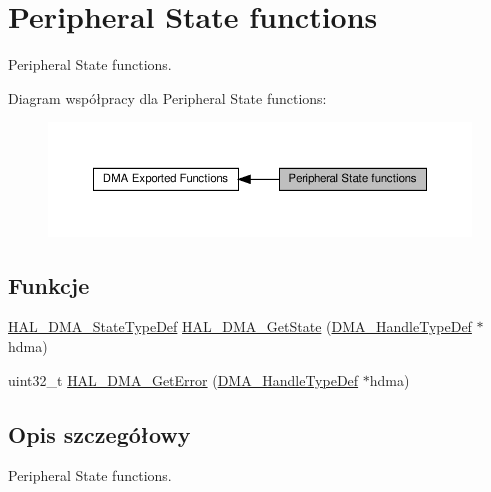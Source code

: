 \hypertarget{group___d_m_a___exported___functions___group3}{}\section{Peripheral State functions}
\label{group___d_m_a___exported___functions___group3}


Peripheral State functions.  


Diagram współpracy dla Peripheral State functions\+:\nopagebreak
\begin{figure}[H]
\begin{center}
\leavevmode
\includegraphics[width=350pt]{group___d_m_a___exported___functions___group3}
\end{center}
\end{figure}
\subsection*{Funkcje}
\begin{DoxyCompactItemize}
\item 
\hyperlink{group___d_m_a___exported___types_ga9c012af359987a240826f29073bbe463}{H\+A\+L\+\_\+\+D\+M\+A\+\_\+\+State\+Type\+Def} \hyperlink{group___d_m_a___exported___functions___group3_gaef09509c41da57dc118c8ffb9533ce3f}{H\+A\+L\+\_\+\+D\+M\+A\+\_\+\+Get\+State} (\hyperlink{group___d_m_a___exported___types_ga41b754a906b86bce54dc79938970138b}{D\+M\+A\+\_\+\+Handle\+Type\+Def} $\ast$hdma)
\item 
uint32\+\_\+t \hyperlink{group___d_m_a___exported___functions___group3_gabc0735694a0dd08e352b796d7fa7634f}{H\+A\+L\+\_\+\+D\+M\+A\+\_\+\+Get\+Error} (\hyperlink{group___d_m_a___exported___types_ga41b754a906b86bce54dc79938970138b}{D\+M\+A\+\_\+\+Handle\+Type\+Def} $\ast$hdma)
\end{DoxyCompactItemize}


\subsection{Opis szczegółowy}
Peripheral State functions. 



